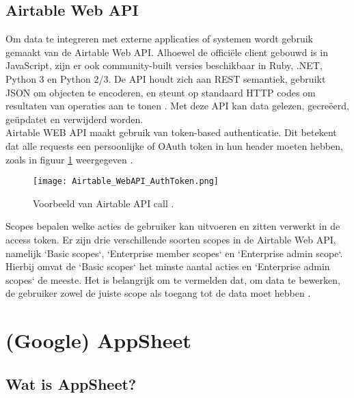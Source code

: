 \subsection{Airtable Web API}
\label{subsec:airtable_web_API}


Om data te integreren met externe applicaties of systemen wordt gebruik gemaakt van de Airtable Web API. Alhoewel de officiële client gebouwd is in JavaScript, zijn er ook community-built versies beschikbaar in Ruby, .NET, Python 3 en Python 2/3. De API houdt zich aan REST semantiek, gebruikt JSON om objecten te encoderen, en steunt op standaard HTTP codes om resultaten van operaties aan te tonen \autocite{AirtableAPI}. Met deze API kan data gelezen, gecreëerd, geüpdatet en verwijderd worden. \\

Airtable WEB API maakt gebruik van token-based authenticatie. Dit betekent dat alle requests een persoonlijke of OAuth token in hun header moeten hebben, zoals in figuur \ref{fig:airtable_authtoken} weergegeven \autocite{AirtableAPIAuthentication}. \\

\begin{figure}[h]
    \centering
    \texttt{[image: Airtable\_WebAPI\_AuthToken.png]}
    \caption[Voorbeeld Airtable API call]{Voorbeeld van Airtable API call \autocite{AirtableAPIAuthentication}.}
    \label{fig:airtable_authtoken}
\end{figure}

Scopes bepalen welke acties de gebruiker kan uitvoeren en zitten verwerkt in de access token. Er zijn drie verschillende soorten scopes in de Airtable Web API, namelijk `Basic scopes`, `Enterprise member scopes` en `Enterprise admin scope`. Hierbij omvat de `Basic scopes` het minste aantal acties en `Enterprise admin scopes` de meeste. Het is belangrijk om te vermelden dat, om data te bewerken, de gebruiker zowel de juiste scope als toegang tot de data moet hebben \autocite{AirtableAPIScopes}. \\

\section{(Google) AppSheet}
\label{sec:Appsheet}


\subsection{Wat is AppSheet?}
\label{subsec:wat_is_appsheet}

